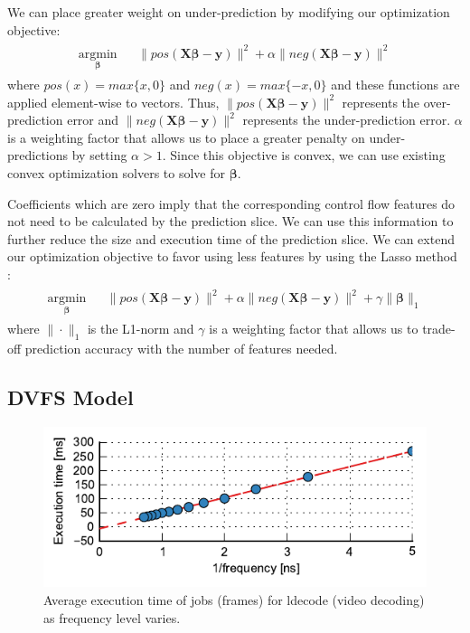 We can place greater weight on under-prediction by modifying our optimization
objective:
\begin{align*}
\begin{aligned}
  \underset{\boldsymbol{\beta}}{\text{argmin}} & & \|pos(\textbf{X}\boldsymbol{\beta} - \textbf{y})\|^2 + \alpha \|neg(\textbf{X}\boldsymbol{\beta} - \textbf{y})\|^2
\end{aligned}
\end{align*}
where $pos(x) = max\{x, 0\}$ and $neg(x) = max\{-x, 0\}$ and these functions
are applied element-wise to vectors. Thus, $\|pos(\textbf{X}\boldsymbol{\beta}
- \textbf{y})\|^2$ represents the over-prediction error and
$\|neg(\textbf{X}\boldsymbol{\beta} - \textbf{y})\|^2$ represents the
under-prediction error. $\alpha$ is a weighting factor that allows us to place
a greater penalty on under-predictions by setting $\alpha > 1$.  Since this
objective is convex, we can use existing convex optimization solvers to solve
for $\boldsymbol{\beta}$.

Coefficients which are zero imply that the corresponding control flow features
do not need to be calculated by the prediction slice. We can use this
information to further reduce the size and execution time of the prediction
slice. We can extend our optimization objective to favor using less features by
using the Lasso method \cite{lasso-jrss96}:
\begin{align*}
\begin{aligned}
  \underset{\boldsymbol{\beta}}{\text{argmin}} & & \|pos(\textbf{X}\boldsymbol{\beta} - \textbf{y})\|^2 + \alpha \|neg(\textbf{X}\boldsymbol{\beta} - \textbf{y})\|^2 + \gamma \|\boldsymbol{\beta}\|_1
\end{aligned}
\end{align*}
where $\|\cdot\|_1$ is the L1-norm and $\gamma$ is a weighting factor that
allows us to trade-off prediction accuracy with the number of features needed.

\subsection{DVFS Model}
\label{sec:exec_time_prediction.prediction.dvfs}

\begin{figure}
  \begin{center}
    \includegraphics{exec_time_prediction/figs/dvfs_linearity.pdf}
    \caption{Average execution time of jobs (frames) for ldecode (video
    decoding) as frequency level varies.}
    \label{fig:exec_time_prediction.prediction.dvfs_linearity}
  \end{center}
\end{figure}

